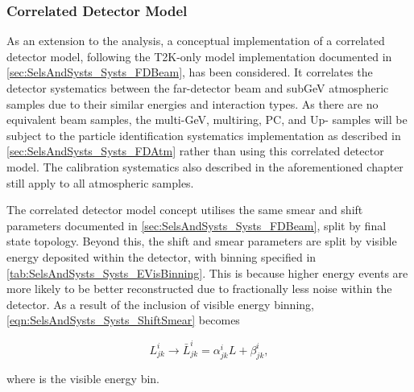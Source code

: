 \subsubsection{Correlated Detector Model}
\label{sec:SelsAndSysts_Systs_Correlated}


As an extension to the analysis, a conceptual implementation of a correlated detector model, following the T2K-only model implementation documented in \autoref{sec:SelsAndSysts_Systs_FDBeam}, has been considered. It correlates the detector systematics between the far-detector beam and subGeV atmospheric samples due to their similar energies and interaction types. As there are no equivalent beam samples, the multi-GeV, multiring, PC, and Up-\quickmath{\mu} samples will be subject to the particle identification systematics implementation as described in \autoref{sec:SelsAndSysts_Systs_FDAtm} rather than using this correlated detector model. The calibration systematics also described in the aforementioned chapter still apply to all atmospheric samples.

The correlated detector model concept utilises the same smear and shift parameters documented in \autoref{sec:SelsAndSysts_Systs_FDBeam}, split by final state topology. Beyond this, the shift and smear parameters are split by visible energy deposited within the detector, with binning specified in \autoref{tab:SelsAndSysts_Systs_EVisBinning}. This is because higher energy events are more likely to be better reconstructed due to fractionally less noise within the detector. As a result of the inclusion of visible energy binning, \autoref{eqn:SelsAndSysts_Systs_ShiftSmear} becomes

\begin{equation}
  \label{eqn:SelsAndSysts_Systs_ShiftSmearWithEVis}
  L^{i}_{jk} \rightarrow \bar{L}^{i}_{jk} = \alpha^{i}_{jk} L + \beta^{i}_{jk},
\end{equation}

where  is the visible energy bin. 

